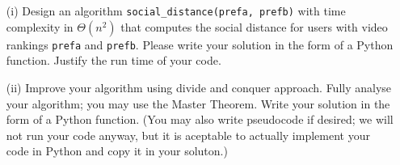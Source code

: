 \documentclass[12pt]{article}
\begin{document}
\begin{enumerate}
\item[(i)] Design an algorithm \verb|social_distance(prefa, prefb)| with time complexity in $\Theta(n^2)$ that computes the social distance for users with video rankings \verb|prefa| and \verb|prefb|. Please write your solution in the form of a Python function. Justify the run time of your code.

\item[(ii)] Improve your algorithm using divide and conquer approach. Fully analyse your algorithm; you may use the Master Theorem.
Write your solution in the form of a Python function. (You may also write pseudocode if desired; we will not run your code anyway, but it is aceptable to actually implement your code in Python and copy it in your soluton.)

\end{enumerate}
\end{document}
